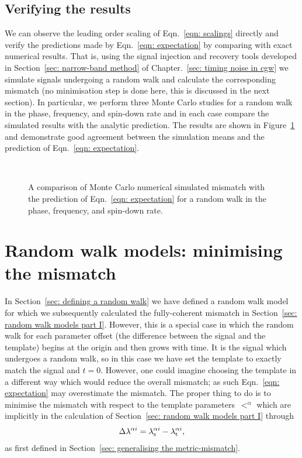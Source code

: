 \documentclass[../full_thesis/full_thesis.tex]{subfiles}
\begin{document}
\subsection{Verifying the results}

We can observe the leading order scaling of Eqn.~\eqref{eqn: scalings}
directly and verify the predictions made by Eqn.~\eqref{eqn: expectation} by
comparing with exact numerical results. That is, using the signal injection and
recovery tools developed in Section~\ref{sec: narrow-band method} of
Chapter.~\ref{sec: timing noise in cgw} we simulate signals undergoing a random
walk and calculate the corresponding mismatch (no minimisation step is done
here, this is discussed in the next section). In particular, we perform three
Monte Carlo studies for a random walk in the phase, frequency, and spin-down
rate and in each case compare the simulated results with the analytic
prediction. The results are shown in Figure~\ref{fig: rw I} and demonstrate good
agreement between the simulation means and the prediction of Eqn.~\eqref{eqn:
expectation}.

\begin{figure}[ht]
\centering
{}
\\ 
\caption{A comparison of Monte Carlo numerical simulated mismatch with the prediction
of Eqn.~\eqref{eqn: expectation} for a random walk in the phase, frequency,
and spin-down rate.}
\label{fig: rw I}
\end{figure}

\section{Random walk models: minimising the mismatch} 
\label{sec: random walk models part II}
In Section~\ref{sec: defining a random walk} we have defined a random walk
model for which we subsequently calculated the fully-coherent mismatch in
Section~\ref{sec: random walk models part I}. However, this is a special case
in which the random walk for each parameter offset (the difference between the
signal and the template) begins at the origin and then grows with time. It is
the signal which undergoes a random walk, so in this case we have set the
template to exactly match the signal and $t=0$. However, one could imagine choosing
the template in a different way which would reduce the overall mismatch; as such
Eqn.~\eqref{eqn: expectation} may overestimate the mismatch. The proper thing to
do is to minimise the mismatch with respect to the
template parameters~$\lt^{\alpha}$ which are implicitly in the calculation of
Section~\ref{sec: random walk models part I} through
\begin{align}
\Delta \lambda^{\alpha i} = {\lambda}_\textrm{s}^{\alpha i} - {\lambda}_\textrm{t}^{\alpha i},
\end{align}
as first defined in Section~\ref{sec: generalising the metric-mismatch}.
\end{document}
